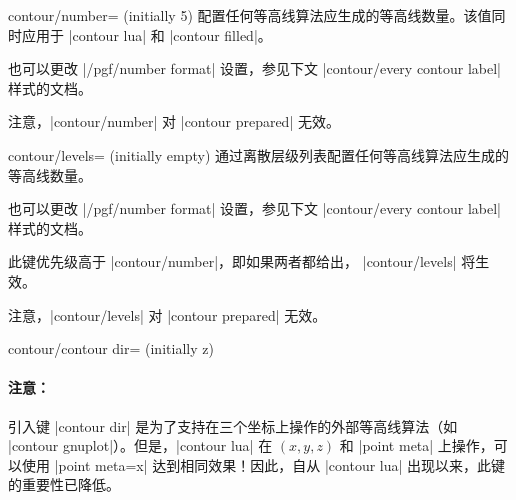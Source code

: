 {{\begin{pgfplotskey}{contour/number= (initially 5)}
    配置任何等高线算法应生成的等高线数量。该值同时应用于
    |contour lua| 和 |contour filled|。
\pgfplotsexpensiveexample
\begin{codeexample}[]
\end{codeexample}
    也可以更改 |/pgf/number format| 设置，参见下文
    |contour/every contour label| 样式的文档。

    注意，|contour/number| 对 |contour prepared| 无效。
\end{pgfplotskey}

\begin{pgfplotskey}{contour/levels= (initially empty)}
    通过离散层级列表配置任何等高线算法应生成的等高线数量。
\pgfplotsexpensiveexample
\begin{codeexample}[]
\end{codeexample}
    也可以更改 |/pgf/number format| 设置，参见下文
    |contour/every contour label| 样式的文档。

    此键优先级高于 |contour/number|，即如果两者都给出，
    |contour/levels| 将生效。

    注意，|contour/levels| 对 |contour prepared| 无效。
\end{pgfplotskey}

\begin{pgfplotskey}{contour/contour dir= (initially z)}
	\paragraph{注意：} 引入键 |contour dir| 是为了支持在三个坐标上操作的外部等高线算法（如 |contour gnuplot|）。但是，|contour lua| 在 $(x,y,z)$ 和 |point meta| 上操作，可以使用 |point meta=x| 达到相同效果！因此，自从 |contour lua| 出现以来，此键的重要性已降低。


\end{pgfplotskey}}}
